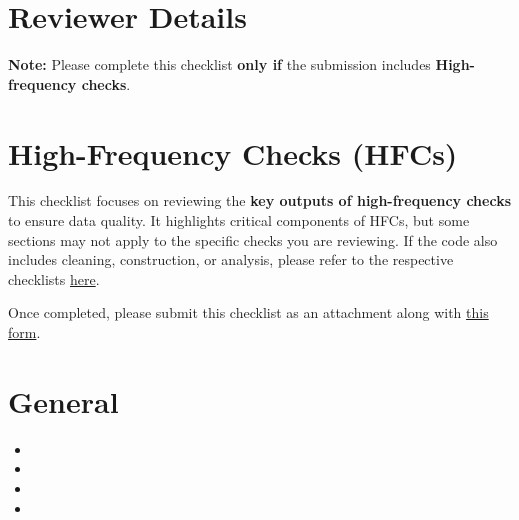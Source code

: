 \documentclass{tufte-handout}
\begin{document}
\thispagestyle{firstpage}

    \begin{fullwidth}
    




        \section*{Reviewer Details}

        \vspace{0.5cm}

        \textbf{Note:} Please complete this checklist \textbf{only if} the submission includes \textbf{High-frequency checks}.

		
\section*{High-Frequency Checks (HFCs)}
This checklist focuses on reviewing the \textbf{key outputs of high-frequency checks} to ensure data quality. It highlights critical components of HFCs, but some sections may not apply to the specific checks you are reviewing. If the code also includes cleaning, construction, or analysis, please refer to the respective checklists \href{https://github.com/worldbank/dime-standards/tree/master/dime-coding-standards/checklists}{here}.

\noindent Once completed, please submit this checklist as an attachment along with \href{https://survey.wb.surveycto.com/collect/code_review_summary?caseid=}{this form}.

\section*{General}
\begin{itemize}
    \setlength\itemsep{-0.1em}
    \item[] 
   \item[] 
    \item[] 
    \item[] 
\end{itemize}




\end{fullwidth}
\end{document}
